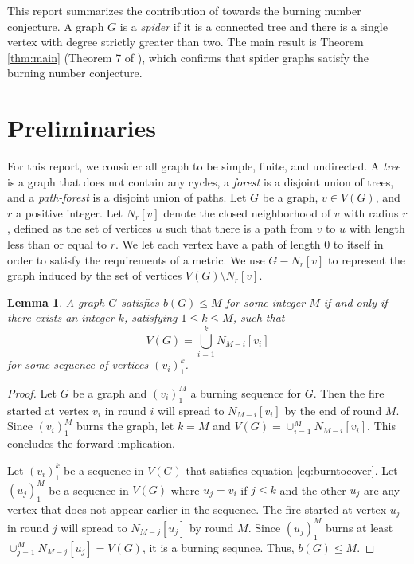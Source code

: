 \documentclass[12pt]{article}
\newtheorem{lemma}[theorem]{Lemma}
\begin{document}
This report summarizes the contribution of \cite{burning_spiders} towards the burning number conjecture.
A graph $G$ is a \textit{spider} if it is a connected tree and there is a single vertex with degree strictly greater than two.
The main result is Theorem \ref{thm:main} (Theorem 7 of \cite{burning_spiders}), which confirms that spider graphs satisfy the burning number conjecture. 

\section{Preliminaries}
For this report, we consider all graph to be simple, finite, and undirected.
A \textit{tree} is a graph that does not contain any cycles, a \textit{forest} is a disjoint union of trees, and a \textit{path-forest} is a disjoint union of paths.
Let $G$ be a graph, $v \in V(G)$, and $r$ a positive integer.
Let $N_{r}[v]$ denote the closed neighborhood of $v$ with radius $r$, defined as the set of vertices $u$ such that there is a path from $v$ to $u$ with length less than or equal to $r$.
We let each vertex have a path of length $0$ to itself in order to satisfy the requirements of a metric.
We use $G - N_r[v]$ to represent the graph induced by the set of vertices $V(G) \setminus N_r[v]$. 

\begin{lemma} \label{lem:burntocover}
    A graph $G$ satisfies $b(G) \leq M$ for some integer $M$ if and only if there exists an integer $k$, satisfying $1 \leq k \leq M$, such that
    \begin{equation}
        V(G) = \bigcup_{i = 1}^k N_{M-i}[v_i] \label{eq:burntocover}
    \end{equation}
    for some sequence of vertices $(v_i)_1^k$.
\end{lemma}
\begin{proof}
    Let $G$ be a graph and $(v_i)_1^M$ a burning sequence for $G$.
    Then the fire started at vertex $v_i$ in round $i$ will spread to $N_{M-i}[v_i]$ by the end of round $M$.
    Since $(v_i)_1^M$ burns the graph, let $k = M$ and $V(G) = \cup_{i=1}^M N_{M-i}[v_i]$.
    This concludes the forward implication.

    Let $(v_i)_1^k$ be a sequence in $V(G)$ that satisfies equation \ref{eq:burntocover}.
    Let $(u_j)_1^M$ be a sequence in $V(G)$ where $u_j = v_i$ if $j \leq k$ and the other $u_j$ are any vertex that does not appear earlier in the sequence.
    The fire started at vertex $u_j$ in round $j$ will spread to $N_{M-j}[u_j]$ by round $M$.
    Since $(u_j)_1^M$ burns at least $\cup_{j=1}^M N_{M-j}[u_j] = V(G)$, it is a burning sequnce.
    Thus, $b(G) \leq M$.
\end{proof}
\end{document}
